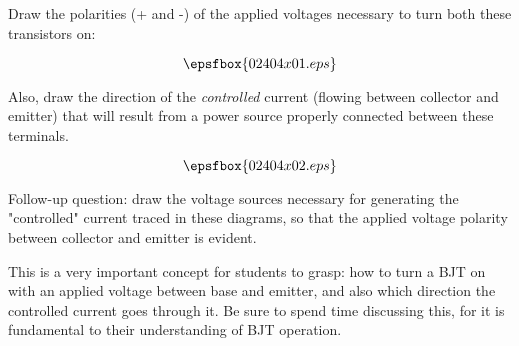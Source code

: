 

Draw the polarities (+ and -) of the applied voltages necessary to turn both these transistors on:

$$\epsfbox{02404x01.eps}$$

Also, draw the direction of the {\it controlled} current (flowing between collector and emitter) that will result from a power source properly connected between these terminals.







$$\epsfbox{02404x02.eps}$$

\vskip 10pt

Follow-up question: draw the voltage sources necessary for generating the "controlled" current traced in these diagrams, so that the applied voltage polarity between collector and emitter is evident.







This is a very important concept for students to grasp: how to turn a BJT on with an applied voltage between base and emitter, and also which direction the controlled current goes through it.  Be sure to spend time discussing this, for it is fundamental to their understanding of BJT operation.





